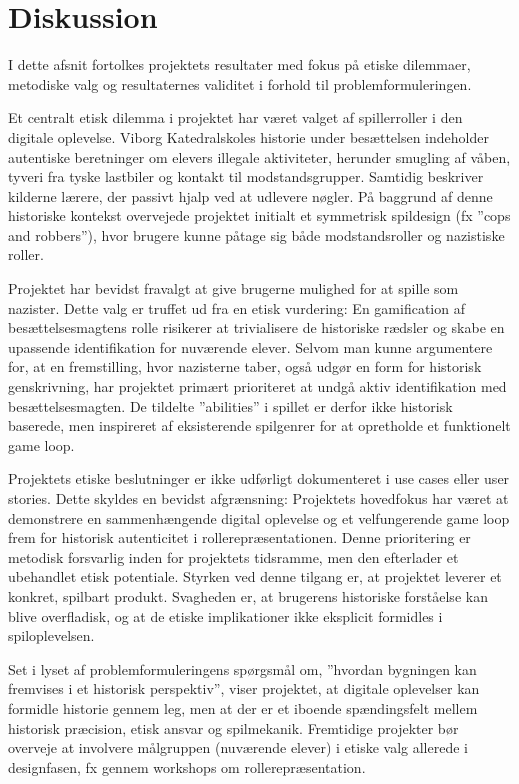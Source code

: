 \section{Diskussion}
I dette afsnit fortolkes projektets resultater med fokus på etiske dilemmaer, metodiske valg og resultaternes validitet i forhold til problemformuleringen.

Et centralt etisk dilemma i projektet har været valget af spillerroller i den digitale oplevelse. Viborg Katedralskoles historie under besættelsen indeholder autentiske beretninger om elevers illegale aktiviteter, herunder smugling af våben, tyveri fra tyske lastbiler og kontakt til modstandsgrupper.\cite{andersen2000viborg} Samtidig beskriver kilderne lærere, der passivt hjalp ved at udlevere nøgler. På baggrund af denne historiske kontekst overvejede projektet initialt et symmetrisk spildesign (fx ”cops and robbers”), hvor brugere kunne påtage sig både modstandsroller og nazistiske roller.

Projektet har bevidst fravalgt at give brugerne mulighed for at spille som nazister. Dette valg er truffet ud fra en etisk vurdering: En gamification af besættelsesmagtens rolle risikerer at trivialisere de historiske rædsler og skabe en upassende identifikation for nuværende elever. Selvom man kunne argumentere for, at en fremstilling, hvor nazisterne taber, også udgør en form for historisk genskrivning, har projektet primært prioriteret at undgå aktiv identifikation med besættelsesmagten. De tildelte ”abilities” i spillet er derfor ikke historisk baserede, men inspireret af eksisterende spilgenrer for at opretholde et funktionelt game loop.

Projektets etiske beslutninger er ikke udførligt dokumenteret i use cases eller user stories. Dette skyldes en bevidst afgrænsning: Projektets hovedfokus har været at demonstrere en sammenhængende digital oplevelse og et velfungerende game loop frem for historisk autenticitet i rollerepræsentationen. Denne prioritering er metodisk forsvarlig inden for projektets tidsramme, men den efterlader et ubehandlet etisk potentiale. Styrken ved denne tilgang er, at projektet leverer et konkret, spilbart produkt. Svagheden er, at brugerens historiske forståelse kan blive overfladisk, og at de etiske implikationer ikke eksplicit formidles i spiloplevelsen.

Set i lyset af problemformuleringens spørgsmål om, ”hvordan bygningen kan fremvises i et historisk perspektiv”, viser projektet, at digitale oplevelser kan formidle historie gennem leg, men at der er et iboende spændingsfelt mellem historisk præcision, etisk ansvar og spilmekanik. Fremtidige projekter bør overveje at involvere målgruppen (nuværende elever) i etiske valg allerede i designfasen, fx gennem workshops om rollerepræsentation.